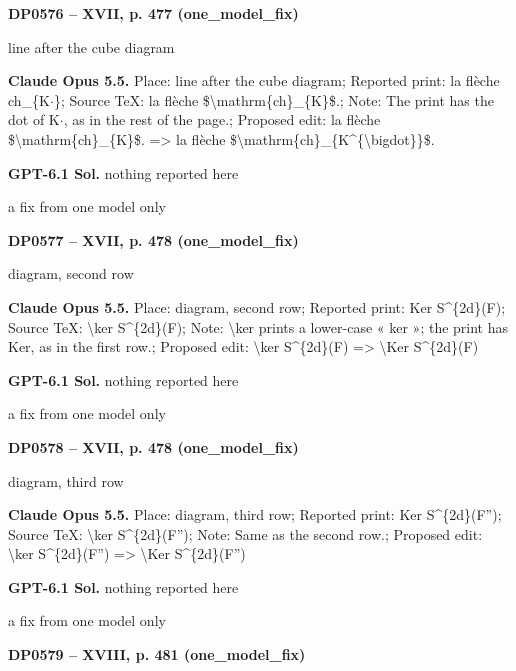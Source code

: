 \par\noindent\hypertarget{DP0576}{}\textbf{DP0576 -- XVII, p. 477 (one\_model\_fix)}\par
line after the cube diagram\par
\textbf{Claude Opus 5.5.} Place: line after the cube diagram; Reported print: la flèche ch\_\{K\ensuremath{\cdot}\}; Source TeX: la flèche \$\textbackslash{}mathrm\{ch\}\_\{K\}\$.; Note: The print has the dot of K\ensuremath{\cdot}, as in the rest of the page.; Proposed edit: la flèche \$\textbackslash{}mathrm\{ch\}\_\{K\}\$. =\allowbreak > la flèche \$\textbackslash{}mathrm\{ch\}\_\{K\textasciicircum{}\{\textbackslash{}bigdot\}\}\$.\par
\textbf{GPT-6.1 Sol.} nothing reported here\par
a fix from one model only\par
\par\noindent\hypertarget{DP0577}{}\textbf{DP0577 -- XVII, p. 478 (one\_model\_fix)}\par
diagram, second row\par
\textbf{Claude Opus 5.5.} Place: diagram, second row; Reported print: Ker S\textasciicircum{}\{2d\}(F); Source TeX: \textbackslash{}ker S\textasciicircum{}\{2d\}(F); Note: \textbackslash{}ker prints a lower-case « ker »; the print has Ker, as in the first row.; Proposed edit: \textbackslash{}ker S\textasciicircum{}\{2d\}(F) =\allowbreak > \textbackslash{}Ker S\textasciicircum{}\{2d\}(F)\par
\textbf{GPT-6.1 Sol.} nothing reported here\par
a fix from one model only\par
\par\noindent\hypertarget{DP0578}{}\textbf{DP0578 -- XVII, p. 478 (one\_model\_fix)}\par
diagram, third row\par
\textbf{Claude Opus 5.5.} Place: diagram, third row; Reported print: Ker S\textasciicircum{}\{2d\}(F''); Source TeX: \textbackslash{}ker S\textasciicircum{}\{2d\}(F''); Note: Same as the second row.; Proposed edit: \textbackslash{}ker S\textasciicircum{}\{2d\}(F'') =\allowbreak > \textbackslash{}Ker S\textasciicircum{}\{2d\}(F'')\par
\textbf{GPT-6.1 Sol.} nothing reported here\par
a fix from one model only\par
\par\noindent\hypertarget{DP0579}{}\textbf{DP0579 -- XVIII, p. 481 (one\_model\_fix)}\par
